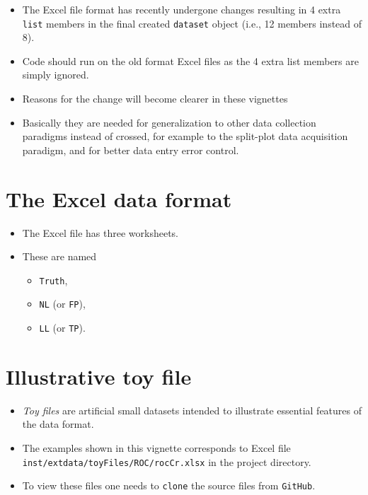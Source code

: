 \documentclass[]{book}
\providecommand{\tightlist}{%
  \setlength{\itemsep}{0pt}\setlength{\parskip}{0pt}}
\begin{document}
\begin{itemize}
\tightlist
\item
  The Excel file format has recently undergone changes resulting in 4 extra \texttt{list} members in the final created \texttt{dataset} object (i.e., 12 members instead of 8).
\item
  Code should run on the old format Excel files as the 4 extra list members are simply ignored.
\item
  Reasons for the change will become clearer in these vignettes
\item
  Basically they are needed for generalization to other data collection paradigms instead of crossed, for example to the split-plot data acquisition paradigm, and for better data entry error control.
\end{itemize}

\hypertarget{the-excel-data-format}{%
\section{The Excel data format}\label{the-excel-data-format}}

\begin{itemize}
\tightlist
\item
  The Excel file has three worksheets.
\item
  These are named

  \begin{itemize}
  \tightlist
  \item
    \texttt{Truth},
  \item
    \texttt{NL} (or \texttt{FP}),
  \item
    \texttt{LL} (or \texttt{TP}).
  \end{itemize}
\end{itemize}

\hypertarget{illustrative-toy-file}{%
\section{Illustrative toy file}\label{illustrative-toy-file}}

\begin{itemize}
\tightlist
\item
  \emph{Toy files} are artificial small datasets intended to illustrate essential features of the data format.\\
\item
  The examples shown in this vignette corresponds to Excel file \texttt{inst/extdata/toyFiles/ROC/rocCr.xlsx} in the project directory.
\item
  To view these files one needs to \texttt{clone} the source files from \texttt{GitHub}.
\end{itemize}
\end{document}

